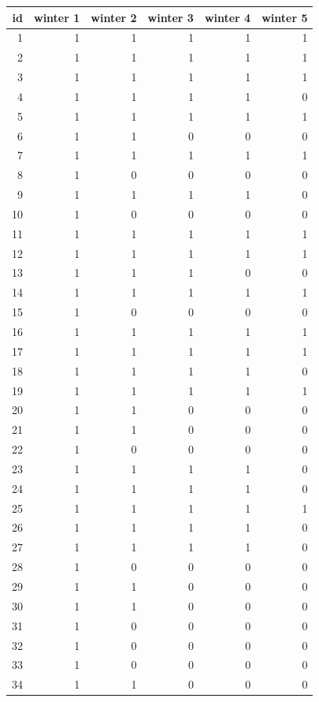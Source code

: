 \documentclass[
  12pt,
]{krantz}
\begin{document}
\begin{tabular}{r|r|r|r|r|r}
\hline
id & winter 1 & winter 2 & winter 3 & winter 4 & winter 5\\
\hline
1 & 1 & 1 & 1 & 1 & 1\\
\hline
2 & 1 & 1 & 1 & 1 & 1\\
\hline
3 & 1 & 1 & 1 & 1 & 1\\
\hline
4 & 1 & 1 & 1 & 1 & 0\\
\hline
5 & 1 & 1 & 1 & 1 & 1\\
\hline
6 & 1 & 1 & 0 & 0 & 0\\
\hline
7 & 1 & 1 & 1 & 1 & 1\\
\hline
8 & 1 & 0 & 0 & 0 & 0\\
\hline
9 & 1 & 1 & 1 & 1 & 0\\
\hline
10 & 1 & 0 & 0 & 0 & 0\\
\hline
11 & 1 & 1 & 1 & 1 & 1\\
\hline
12 & 1 & 1 & 1 & 1 & 1\\
\hline
13 & 1 & 1 & 1 & 0 & 0\\
\hline
14 & 1 & 1 & 1 & 1 & 1\\
\hline
15 & 1 & 0 & 0 & 0 & 0\\
\hline
16 & 1 & 1 & 1 & 1 & 1\\
\hline
17 & 1 & 1 & 1 & 1 & 1\\
\hline
18 & 1 & 1 & 1 & 1 & 0\\
\hline
19 & 1 & 1 & 1 & 1 & 1\\
\hline
20 & 1 & 1 & 0 & 0 & 0\\
\hline
21 & 1 & 1 & 0 & 0 & 0\\
\hline
22 & 1 & 0 & 0 & 0 & 0\\
\hline
23 & 1 & 1 & 1 & 1 & 0\\
\hline
24 & 1 & 1 & 1 & 1 & 0\\
\hline
25 & 1 & 1 & 1 & 1 & 1\\
\hline
26 & 1 & 1 & 1 & 1 & 0\\
\hline
27 & 1 & 1 & 1 & 1 & 0\\
\hline
28 & 1 & 0 & 0 & 0 & 0\\
\hline
29 & 1 & 1 & 0 & 0 & 0\\
\hline
30 & 1 & 1 & 0 & 0 & 0\\
\hline
31 & 1 & 0 & 0 & 0 & 0\\
\hline
32 & 1 & 0 & 0 & 0 & 0\\
\hline
33 & 1 & 0 & 0 & 0 & 0\\
\hline
34 & 1 & 1 & 0 & 0 & 0\\

\end{tabular}
\end{document}
